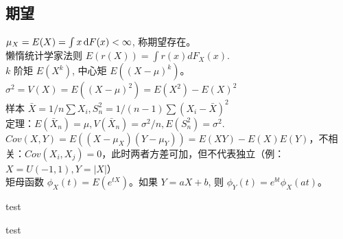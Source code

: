 \documentclass[titlepage, a4paper, landscape]{article}
\begin{document}
\begin{multicols}{4}
\section{期望}
$\mu_X = E(X) =  \int x \,\mathrm{d} F(x) < \infty$, 称期望存在。 \\
懒惰统计学家法则 $E(r(X)) = \int r(x) d F_X(x).$ \\
$k$ 阶矩 $E(X^k)$, 中心矩 $E((X - \mu)^k)$。 \\
$\sigma ^ 2 = V(X) = E((X - \mu)^2) = E(X^2) - E(X)^2$ \\
样本 $\bar X = 1/n \sum X_i, S_n^2 = 1/(n-1) \sum (X_i - \bar X)^2$ \\
定理：$E(\bar X_n) = \mu, V(\bar X_n) = \sigma ^ 2 / n, E(S_n^2) = \sigma^2.$
$Cov(X, Y) = E((X - \mu_X)(Y - \mu_Y))=E(XY)-E(X)E(Y)$，不相关：$Cov(X_i, X_j) = 0$，此时两者方差可加，但不代表独立（例：$X=U(-1, 1), Y = |X|$）\\
矩母函数 $\phi_X(t) = E(e^{tX})$。如果 $Y = aX + b$, 则 $\phi_Y(t) = e^{bt} \phi_X(at)$。\\
		\newcolumn
		
		test
	\end{multicols}
	\newpage
	test
	
\end{document}
